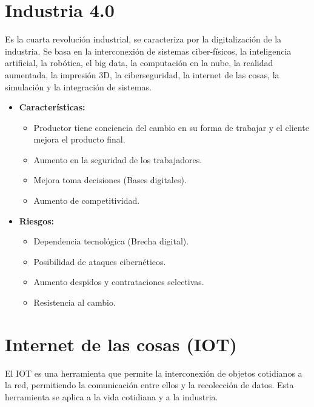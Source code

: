 \documentclass{templateNote}
\begin{document}
\section{Industria 4.0}
\noindent Es la cuarta revolución industrial, se caracteriza por la digitalización de la industria. Se basa en la interconexión de sistemas ciber-físicos, la inteligencia artificial, la robótica, el big data, la computación en la nube, la realidad aumentada, la impresión 3D, la ciberseguridad, la internet de las cosas, la simulación y la integración de sistemas.
\begin{itemize}
    \item \textbf{Características:}
    \begin{itemize}
        \item Productor tiene conciencia del cambio en su forma de trabajar y el cliente mejora el producto final.
        \item Aumento en la seguridad de los trabajadores.
        \item Mejora toma decisiones (Bases digitales).
        \item Aumento de competitividad.
    \end{itemize}

    \newpage
    \item \textbf{Riesgos:}
    \begin{itemize}
        \item Dependencia tecnológica (Brecha digital).
        \item Posibilidad de ataques cibernéticos.
        \item Aumento despidos y contrataciones selectivas.
        \item Resistencia al cambio.
    \end{itemize}
\end{itemize}
\section{Internet de las cosas (IOT)}
\noindent El IOT es una herramienta que permite la interconexión de objetos cotidianos a la red, permitiendo la comunicación entre ellos y la recolección de datos. Esta herramienta se aplica a la vida cotidiana y a la industria.
\end{document}
